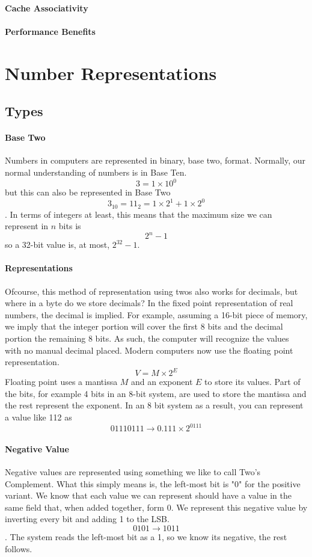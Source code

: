 \paragraph{Cache Associativity}
\paragraph{Performance Benefits}

\section{Number Representations}
\subsection{Types}
\paragraph{Base Two}
Numbers in computers are represented in binary, base two, format. Normally, our normal understanding of numbers is in Base Ten. \[3 = 1 \times 10^0\] but this can also be represented in Base Two \[3_10 = 11_2 = 1 \times 2^1 + 1 \times 2^0\]. In terms of integers at least, this means that the maximum size we can represent in $n$ bits is \[2^n - 1\] so a 32-bit value is, at most, $2^{32} - 1$.
\paragraph{Representations}
Ofcourse, this method of representation using twos also works for decimals, but where in a byte do we store decimals? In the fixed point representation of real numbers, the decimal is implied. For example, assuming a 16-bit piece of memory, we imply that the integer portion will cover the first 8 bits and the decimal portion the remaining 8 bits. As such, the computer will recognize the values with no manual decimal placed.
Modern computers now use the floating point representation. \[V = M \times 2^E\] Floating point uses a mantissa $M$ and an exponent $E$ to store its values. Part of the bits, for example 4 bits in an 8-bit system, are used to store the mantissa and the rest represent the exponent. In an 8 bit system as a result, you can represent a value like 112 as \[01110111 \rightarrow 0.111 \times 2^{0111}\]
\paragraph{Negative Value}
Negative values are represented using something we like to call Two's Complement. What this simply means is, the left-most bit is "0" for the positive variant. We know that each value we can represent should have a value in the same field that, when added together, form $0$. We represent this negative value by inverting every bit and adding 1 to the LSB. \[ 0101 \rightarrow 1011\]. The system reads the left-most bit as a 1, so we know its negative, the rest follows.

